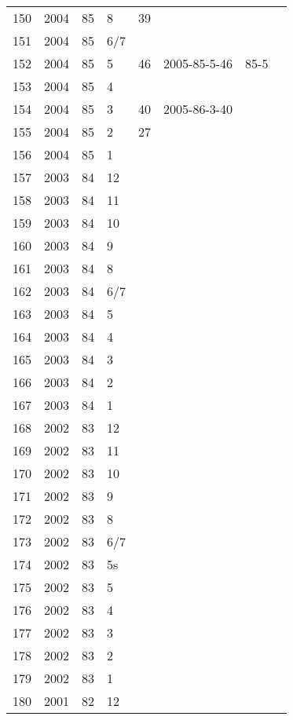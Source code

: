 \begin{longtable}{ |l|l|l|l|l|l|l|l| }
150 & 2004 & 85 &     8 &      39 &  &  & \\
151 & 2004 & 85 &   6/7 &         &  &  & \\
152 & 2004 & 85 &     5 &      46 & 2005-85-5-46 & 85-5 & \\
153 & 2004 & 85 &     4 &         &  &  & \\
154 & 2004 & 85 &     3 &      40 & 2005-86-3-40 &  & \\
155 & 2004 & 85 &     2 &      27 &  &  & \\
156 & 2004 & 85 &     1 &         &  &  & \\
157 & 2003 & 84 &    12 &         &  &  & \\
158 & 2003 & 84 &    11 &         &  &  & \\
159 & 2003 & 84 &    10 &         &  &  & \\
160 & 2003 & 84 &     9 &         &  &  & \\
161 & 2003 & 84 &     8 &         &  &  & \\
162 & 2003 & 84 &   6/7 &         &  &  & \\
163 & 2003 & 84 &     5 &         &  &  & \\
164 & 2003 & 84 &     4 &         &  &  & \\
165 & 2003 & 84 &     3 &         &  &  & \\
166 & 2003 & 84 &     2 &         &  &  & \\
167 & 2003 & 84 &     1 &         &  &  & \\
168 & 2002 & 83 &    12 &         &  &  & \\
169 & 2002 & 83 &    11 &         &  &  & \\
170 & 2002 & 83 &    10 &         &  &  & \\
171 & 2002 & 83 &     9 &         &  &  & \\
172 & 2002 & 83 &     8 &         &  &  & \\
173 & 2002 & 83 &   6/7 &         &  &  & \\
174 & 2002 & 83 &    5s &         &  &  & \\
175 & 2002 & 83 &     5 &         &  &  & \\
176 & 2002 & 83 &     4 &         &  &  & \\
177 & 2002 & 83 &     3 &         &  &  & \\
178 & 2002 & 83 &     2 &         &  &  & \\
179 & 2002 & 83 &     1 &         &  &  & \\
180 & 2001 & 82 &    12 &         &  &  & \\

\end{longtable}
